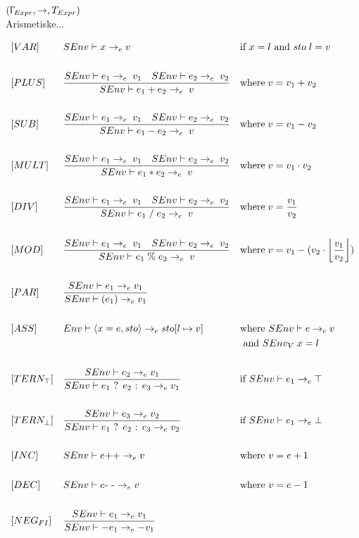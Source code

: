 $ (\Upgamma_{Expr}, \rightarrow, T_{Expr}) $\\

\noindent Arismetiske...

\begin{align*}
&[VAR] & &SEnv \vdash x \rightarrow_e v & &\text{if } x = l \text{ and } sto\; l = v\\\\
&[PLUS] & &\frac{SEnv \vdash e_1 \rightarrow_e\; v_1\quad SEnv \vdash e_2 \rightarrow_e\; v_2}{SEnv \vdash e_1 + e_2 \rightarrow_e\; v} & &\text{where}\; v = v_1 + v_2\\\\
&[SUB] & &\frac{SEnv \vdash e_1 \rightarrow_e\; v_1\quad SEnv \vdash e_2 \rightarrow_e\; v_2}{SEnv \vdash e_1 - e_2 \rightarrow_e\; v} & &\text{where}\; v = v_1 - v_2\\\\
&[MULT] & &\frac{SEnv \vdash e_1 \rightarrow_e\; v_1\quad SEnv \vdash e_2 \rightarrow_e\; v_2}{SEnv \vdash e_1 * e_2 \rightarrow_e\; v} & &\text{where}\; v = v_1 \cdot v_2\\\\
&[DIV] & &\frac{SEnv \vdash e_1 \rightarrow_e\; v_1\quad SEnv \vdash e_2 \rightarrow_e\; v_2}{SEnv \vdash e_1\; /\; e_2 \rightarrow_e\; v} & &\text{where}\; v = \frac{v_1}{v_2}\\\\
&[MOD] & &\frac{SEnv \vdash e_1 \rightarrow_e\; v_1\quad SEnv \vdash e_2 \rightarrow_e\; v_2}{SEnv \vdash e_1\; \%\; e_2 \rightarrow_e\; v} & &\text{where}\; v = v_1 - (v_2 \cdot \floor*{\frac{v_1}{v_2}})\\\\
&[PAR] & &\frac{SEnv \vdash e_1 \rightarrow_e v_1}{SEnv \vdash (e_1) \rightarrow_e v_1}\\\\
&[ASS] & &Env \vdash \langle x = e, sto \rangle \rightarrow_e sto[l \mapsto v] & &\text{where } SEnv \vdash e \rightarrow_e v\\
& & & & &\text{ and } SEnv_V\; x = l\\\\
&[TERN_\top] & &\frac{SEnv \vdash e_2 \rightarrow_e v_1}{SEnv \vdash e_1 \text{ ? } e_2 \text{ : } e_3 \rightarrow_e v_1} & &\text{if } SEnv \vdash e_1 \rightarrow_e \top\\\\
&[TERN_\bot] & &\frac{SEnv \vdash e_3 \rightarrow_e v_2}{SEnv \vdash e_1 \text{ ? } e_2 \text{ : } e_3 \rightarrow_e v_2} & &\text{if } SEnv \vdash e_1 \rightarrow_e \bot\\\\
&[INC] & &SEnv \vdash e \text{++} \rightarrow_e v& &\text{where } v = e + 1\\\\
&[DEC] & &SEnv \vdash e \text{- -} \rightarrow_e v& &\text{where } v = e - 1\\\\
&[NEG_{FI}] & &\frac{SEnv \vdash e_1 \rightarrow_e v_1}{SEnv \vdash -e_1 \rightarrow_e -v_1}  & &\\\\
\end{align*}

